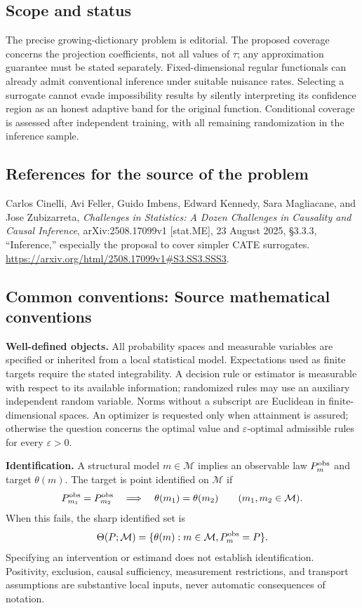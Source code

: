 \documentclass[11pt,a4paper]{article}
\begin{document}
\subsection*{Scope and status}
The precise growing-dictionary problem is editorial. The proposed coverage concerns the projection coefficients, not all values of $\tau$; any approximation guarantee must be stated separately. Fixed-dimensional regular functionals can already admit conventional inference under suitable nuisance rates. Selecting a surrogate cannot evade impossibility results by silently interpreting its confidence region as an honest adaptive band for the original function. Conditional coverage is assessed after independent training, with all remaining randomization in the inference sample.
\subsection*{References for the source of the problem}
Carlos Cinelli, Avi Feller, Guido Imbens, Edward Kennedy, Sara Magliacane, and Jose Zubizarreta, \emph{Challenges in Statistics: A Dozen Challenges in Causality and Causal Inference}, arXiv:2508.17099v1 [stat.ME], 23 August 2025, \S3.3.3, ``Inference,'' especially the proposal to cover simpler CATE surrogates. \url{https://arxiv.org/html/2508.17099v1#S3.SS3.SSS3}.

\subsection*{Common conventions: Source mathematical conventions}

\textbf{Well-defined objects.}
All probability spaces and measurable variables are specified or inherited
from a local statistical model. Expectations used as finite targets require
the stated integrability. A decision rule or estimator is measurable with
respect to its available information; randomized rules may use an auxiliary
independent random variable. Norms without a subscript are Euclidean in
finite-dimensional spaces. An optimizer is requested only when attainment
is assured; otherwise the question concerns the optimal value and
$\varepsilon$-optimal admissible rules for every $\varepsilon>0$.

\textbf{Identification.}
A structural model $m\in\mathcal M$ implies an observable law
$P_m^{\rm obs}$ and target $\theta(m)$. The target is point identified on
$\mathcal M$ if
\[
 P_{m_1}^{\rm obs}=P_{m_2}^{\rm obs}
 \quad\Longrightarrow\quad\theta(m_1)=\theta(m_2)
 \qquad(m_1,m_2\in\mathcal M).
\]
When this fails, the sharp identified set is
\[
 \Theta(P;\mathcal M)=\{\theta(m):m\in\mathcal M,
                                  P_m^{\rm obs}=P\}.
\]
Specifying an intervention or estimand does not establish identification.
Positivity, exclusion, causal sufficiency, measurement restrictions, and
transport assumptions are substantive local inputs, never automatic
consequences of notation.
\end{document}
